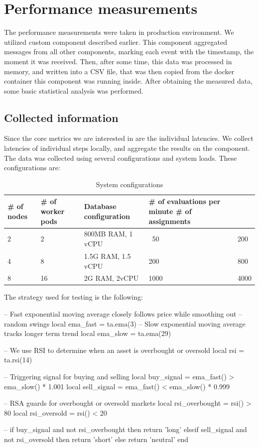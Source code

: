 \section{Performance measurements}
The performance measurements were taken in production environment. We utilized custom component described earlier. This component aggregated
messages from all other components, marking each event with the timestamp, the moment it was received. Then, after some time, this
data was processed in memory, and written into a CSV file, that was then copied from the docker container this component was
running inside. After obtaining the measured data, some basic statistical analysis was performed.

\subsection{Collected information}
Since the core metrics we are interested in are the individual latencies. We collect latencies of individual steps locally, and
aggregate the results on the  component. The data was collected using several configurations and system loads.
These configurations are:

\begin{table}[H]
    \begin{tabular}{|l|l|l|l|l|}
        \hline
        \# of nodes & \# of worker pods & Database configuration & \# of evaluations per minute \# of assignments \\ \hline

        2 & 2 & 800MB RAM, 1 vCPU & ~50 & 200 \\ \hline
        4 & 8 & 1.5G RAM, 1.5 vCPU & 200 & 800 \\ \hline
        8 & 16 & 2G RAM, 2vCPU & 1000 & 4000 \\ \hline
    \end{tabular}
    \caption{System configurations}
\end{table}
\newpage
The strategy used for testing is the following:


\begin{code}[language={[5.2]Lua},label={test_strategy},caption={Example strategy}]
-- Fast exponential moving average closely follows price while smoothing out
-- random swings
local ema_fast = ta.ema(3)
-- Slow exponential moving average tracks longer term trend
local ema_slow = ta.ema(29)

-- We use RSI to determine when an asset is overbought or oversold
local rsi = ta.rsi(14)

-- Triggering signal for buying and selling
local buy_signal = ema_fast() > ema_slow() * 1.001
local sell_signal = ema_fast() < ema_slow() * 0.999

-- RSA guards for overbought or oversold markets
local rsi_overbought = rsi() > 80
local rsi_oversold = rsi() < 20

--
if buy_signal and not rsi_overbought then
    return 'long'
elseif sell_signal and not rsi_oversold then
    return 'short'
else
    return 'neutral'
end
\end{code}
